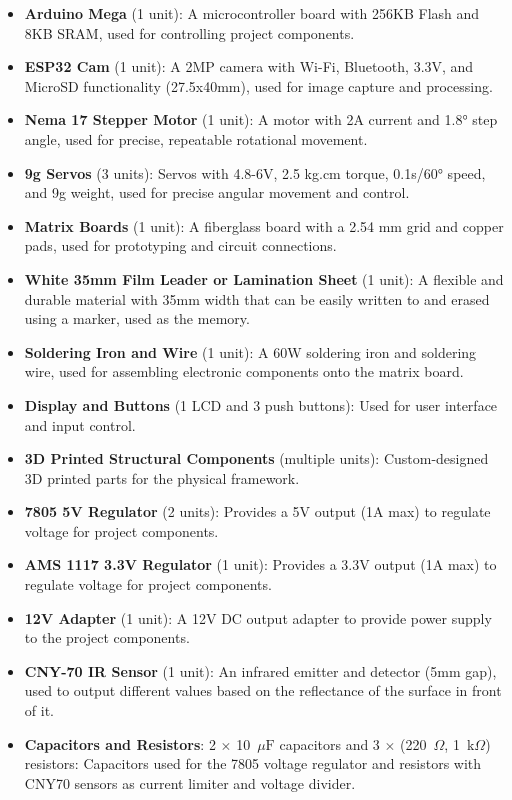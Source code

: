 \begin{itemize}
    \item \textbf{Arduino Mega} (1 unit): A microcontroller board with 256KB Flash and 8KB SRAM, used for controlling project components.
    \item \textbf{ESP32 Cam} (1 unit): A 2MP camera with Wi-Fi, Bluetooth, 3.3V, and MicroSD functionality (27.5x40mm), used for image capture and processing.
    \item \textbf{Nema 17 Stepper Motor} (1 unit): A motor with 2A current and 1.8° step angle, used for precise, repeatable rotational movement.
    \item \textbf{9g Servos} (3 units): Servos with 4.8-6V, 2.5 kg.cm torque, 0.1s/60° speed, and 9g weight, used for precise angular movement and control.
    \item \textbf{Matrix Boards} (1 unit): A fiberglass board with a 2.54 mm grid and copper pads, used for prototyping and circuit connections.
    \item \textbf{White 35mm Film Leader or Lamination Sheet} (1 unit): A flexible and durable material with 35mm width that can be easily written to and erased using a marker, used as the memory.
    \item \textbf{Soldering Iron and Wire} (1 unit): A 60W soldering iron and soldering wire, used for assembling electronic components onto the matrix board.
    \item \textbf{Display and Buttons} (1 LCD and 3 push buttons): Used for user interface and input control.
    \item \textbf{3D Printed Structural Components} (multiple units): Custom-designed 3D printed parts for the physical framework.
    \item \textbf{7805 5V Regulator} (2 units): Provides a 5V output (1A max) to regulate voltage for project components.
    \item \textbf{AMS 1117 3.3V Regulator} (1 unit): Provides a 3.3V output (1A max) to regulate voltage for project components.
    \item \textbf{12V Adapter} (1 unit): A 12V DC output adapter to provide power supply to the project components.
    \item \textbf{CNY-70 IR Sensor} (1 unit): An infrared emitter and detector (5mm gap), used to output different values based on the reflectance of the surface in front of it.
    \item \textbf{Capacitors and Resistors}: 
    2 \(\times\) 10~\(\mu\text{F}\) capacitors and 
    3 \(\times\) (220~\(\Omega\), 1~k\(\Omega\)) resistors: 
    Capacitors used for the 7805 voltage regulator and resistors with CNY70 sensors as current limiter and voltage divider.
    
\end{itemize}

